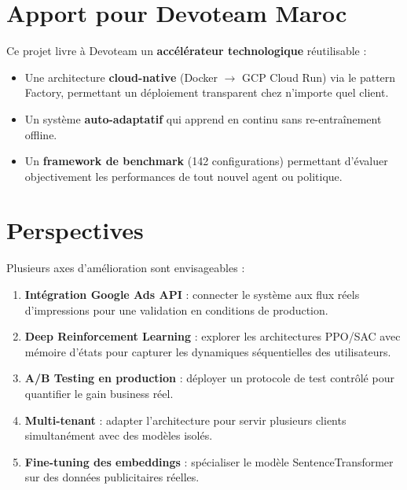 \section*{Apport pour Devoteam Maroc}

Ce projet livre à Devoteam un \textbf{accélérateur technologique} réutilisable :
\begin{itemize}
    \item Une architecture \textbf{cloud-native} (Docker $\to$ GCP Cloud Run) via le pattern Factory, permettant un déploiement transparent chez n'importe quel client.
    \item Un système \textbf{auto-adaptatif} qui apprend en continu sans re-entraînement offline.
    \item Un \textbf{framework de benchmark} (142 configurations) permettant d'évaluer objectivement les performances de tout nouvel agent ou politique.
\end{itemize}

\section*{Perspectives}

Plusieurs axes d'amélioration sont envisageables :

\begin{enumerate}
    \item \textbf{Intégration Google Ads API} : connecter le système aux flux réels d'impressions pour une validation en conditions de production.
    \item \textbf{Deep Reinforcement Learning} : explorer les architectures PPO/SAC avec mémoire d'états pour capturer les dynamiques séquentielles des utilisateurs.
    \item \textbf{A/B Testing en production} : déployer un protocole de test contrôlé pour quantifier le gain business réel.
    \item \textbf{Multi-tenant} : adapter l'architecture pour servir plusieurs clients simultanément avec des modèles isolés.
    \item \textbf{Fine-tuning des embeddings} : spécialiser le modèle SentenceTransformer sur des données publicitaires réelles.
\end{enumerate}
